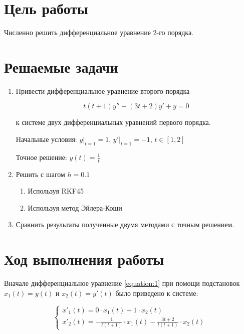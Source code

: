 




\section{Цель работы}
Численно решить дифференциальное уравнение 2-го порядка.

\section{Решаемые задачи}
\begin{enumerate}

\item Привести дифференциальное уравнение второго порядка

\label{equation:1}
\begin{equation}
	t(t+1)y'' + (3t+2)y'  + y = 0
\end{equation}

к системе двух дифференциальных уравнений первого порядка.

	Начальные условия: $\left.y \right|_{t=1} = 1$, $\left.y' \right|_{t=1} = -1$, $t \in[1, 2]$  

    Точное решение: $y(t)=\frac{1}{t}$	

\item Решить с шагом $h = 0.1$

\begin{enumerate}[label=\arabic*)]
\item Используя RKF45
\item Используя метод Эйлера-Коши
\end{enumerate}

\item Сравнить результаты полученные двумя методами с точным решением.

\end{enumerate}

\section{Ход выполнения работы}

Вначале дифференциальное уравнение \ref{equation:1} при помощи подстановок $x_1(t) = y(t)$ и $x_2(t) = y'(t)$ было приведено к системе:

\begin{displaymath}
\begin{cases}
	x'_1(t) = 0 \cdot x_1(t) + 1 \cdot x_2(t)
	\\
	x'_2(t) = - \frac{1}{t(t+1)} \cdot x_1(t) - \frac{3t+2}{t(t+1)} \cdot x_2(t)
\end{cases}
\end{displaymath}

